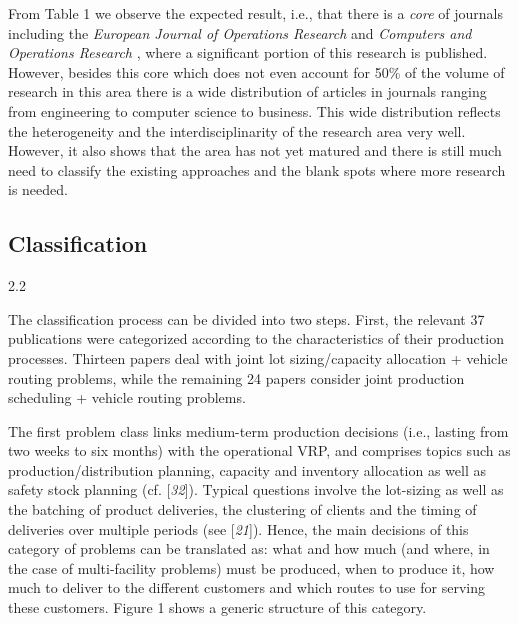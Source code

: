 \twocolumn 
\par From Table 1 we observe the expected result,
 i.e., that there is a \textit{core} of journals including the
 \textit{European Journal of Operations Research} and \textit{Computers and
 Operations Research} , where a significant portion of this research is
 published. However, besides this core which does not even account for 50\% of the
 volume of research in this area there is a wide distribution of articles in journals
 ranging from engineering to computer science to business. This wide distribution
 reflects the heterogeneity and the interdisciplinarity of the research area very
 well. However, it also shows that the area has not yet matured and there is still
 much need to classify the existing approaches and the blank spots where more research
 is needed.\subsection*{Classification}2.2\par The classification process can be divided into two steps. First, the relevant 37
 publications were categorized according to the characteristics of their production
 processes. Thirteen papers deal with joint lot sizing/capacity allocation + vehicle
 routing problems, while the remaining 24 papers consider joint production scheduling
 + vehicle routing problems.\par The first problem class links medium-term production decisions (i.e., lasting from
 two weeks to six months) with the operational VRP, and comprises topics such as
 production/distribution planning, capacity and inventory allocation as well as safety
 stock planning (cf. [\textit{32}]). Typical questions
 involve the lot-sizing as well as the batching of product deliveries, the clustering
 of clients and the timing of deliveries over multiple periods (see [\textit{21}]). Hence, the main decisions of this category
 of problems can be translated as: what and how much (and where, in the case of
 multi-facility problems) must be produced, when to produce it, how much to deliver to
 the different customers and which routes to use for serving these customers. Figure 1 shows a generic structure of this
 category.
